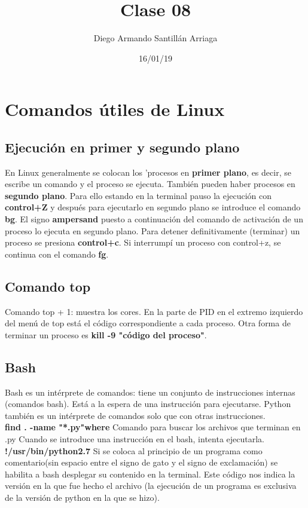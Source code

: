 \documentclass[letterpaper, 12pt, oneside]{article}%
\title{\Huge Clase 08}
\author{Diego Armando Santillán Arriaga}
\date{16/01/19}
\begin{document}
	\maketitle
	\newpage
	\section{Comandos útiles de Linux}
	\subsection{Ejecución en primer y segundo plano}
	En Linux generalmente se colocan los 'procesos en \textbf{primer plano}, es decir, se escribe un comando y el proceso se ejecuta. También pueden haber procesos en \textbf{segundo plano}. Para ello estando en la terminal pauso la ejecución con \textbf{control+Z} y después para ejecutarlo en segundo plano se introduce el comando \textbf{bg}. 
	El signo \textbf{ampersand} puesto a continuación del comando de activación de un proceso lo ejecuta en segundo plano.
	Para detener definitivamente (terminar) un proceso se presiona \textbf{control+c}.
	Si interrumpí un proceso con control+z, se continua con el comando \textbf{fg}.\subsection{Comando top} 
	Comando top + 1: muestra los cores. En la parte de PID en el extremo izquierdo del menú de top está el código correspondiente a cada proceso. 
	Otra forma de terminar un proceso es \textbf{kill -9 "código del proceso"}.
	\subsection{Bash}
	Bash es un intérprete de comandos: tiene un conjunto de instrucciones internas (comandos bash). Está a la espera de una instrucción para ejecutarse. Python también es un intérprete de comandos solo que con otras instrucciones.
	\\
	\textbf{find . -name "*.py"where} Comando para buscar los archivos que terminan en .py
	Cuando se introduce una instrucción en el bash, intenta ejecutarla.
	\textbf{!/usr/bin/python2.7} Si se coloca al principio de un programa como comentario(sin espacio entre el signo de gato y el signo de exclamación) se habilita a bash desplegar su contenido en la terminal. Este código nos indica la versión en la que fue hecho el archivo (la ejecución de un programa es exclusiva de la versión de python en la que se hizo).
\end{document}
